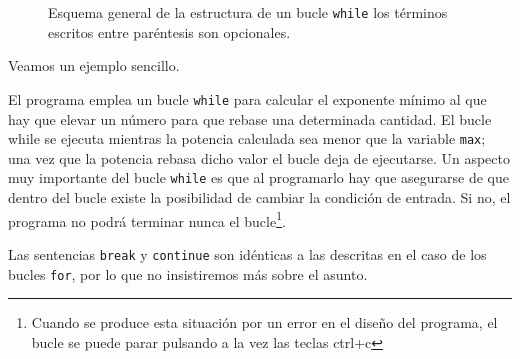 \begin{figure}[h]
\centering
{}
\caption{Esquema general de la estructura de un bucle \texttt{while} los términos escritos entre paréntesis son opcionales.}
\label{fig:while}
\end{figure}

Veamos un ejemplo sencillo. 


  

El programa emplea un bucle \texttt{while} para calcular el exponente mínimo al que hay que elevar un número para que rebase una determinada cantidad. El bucle while se ejecuta mientras la potencia calculada sea menor que la variable \texttt{max}; una vez que la potencia rebasa dicho valor el bucle deja de ejecutarse. Un aspecto muy importante del bucle \texttt{while} es que al programarlo hay que asegurarse de que dentro del bucle existe la posibilidad de cambiar la condición de entrada. Si no, el programa no podrá terminar nunca el bucle\footnote{Cuando se produce esta situación por un error en el diseño del programa, el bucle se puede parar pulsando a la vez las teclas ctrl+c}.

Las sentencias \texttt{break} y \texttt{continue} son idénticas a las descritas en el caso de los bucles \texttt{for}, por lo que no insistiremos más sobre el asunto.

